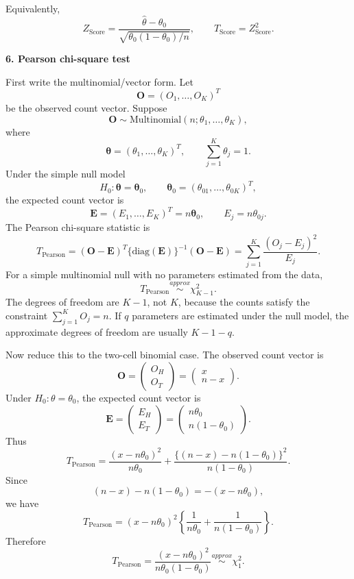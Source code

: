 \documentclass[12pt]{article}
\begin{document}
Equivalently,
\[
Z_{\mathrm{Score}}
=\frac{\hat\theta-\theta_0}{\sqrt{\theta_0(1-\theta_0)/n}},
\qquad
T_{\mathrm{Score}}=Z_{\mathrm{Score}}^2.
\]
\smallskip

{\bf 6. Pearson chi-square test}

First write the multinomial/vector form. Let
\[
\mathbf O=(O_1,\ldots,O_K)^T
\]
be the observed count vector. Suppose
\[
\mathbf O\sim \mathrm{Multinomial}(n;\theta_1,\ldots,\theta_K),
\]
where
\[
\boldsymbol\theta=(\theta_1,\ldots,\theta_K)^T,
\qquad
\sum_{j=1}^K \theta_j=1.
\]
Under the simple null model
\[
H_0: \boldsymbol\theta=\boldsymbol\theta_0,
\qquad
\boldsymbol\theta_0=(\theta_{01},\ldots,\theta_{0K})^T,
\]
the expected count vector is
\[
\mathbf E=(E_1,\ldots,E_K)^T=n\boldsymbol\theta_0,
\qquad
E_j=n\theta_{0j}.
\]
The Pearson chi-square statistic is
\[
T_{\mathrm{Pearson}}
=(\mathbf O-\mathbf E)^T
\{\mathrm{diag}(\mathbf E)\}^{-1}
(\mathbf O-\mathbf E)
=\sum_{j=1}^K \frac{(O_j-E_j)^2}{E_j}.
\]
For a simple multinomial null with no parameters estimated from the data,
\[
T_{\mathrm{Pearson}}\overset{approx}{\sim}\chi^2_{K-1}.
\]
The degrees of freedom are $K-1$, not $K$, because the counts satisfy the constraint $\sum_{j=1}^K O_j=n$.
If $q$ parameters are estimated under the null model, the approximate degrees of freedom are usually $K-1-q$.

Now reduce this to the two-cell binomial case. The observed count vector is
\[
\mathbf O=\begin{pmatrix}O_H\\O_T\end{pmatrix}
=\begin{pmatrix}x\\n-x\end{pmatrix}.
\]
Under $H_0:\theta=\theta_0$, the expected count vector is
\[
\mathbf E=\begin{pmatrix}E_H\\E_T\end{pmatrix}
=\begin{pmatrix}n\theta_0\\n(1-\theta_0)\end{pmatrix}.
\]
Thus
\[
T_{\mathrm{Pearson}}
=\frac{(x-n\theta_0)^2}{n\theta_0}
+\frac{\{(n-x)-n(1-\theta_0)\}^2}{n(1-\theta_0)}.
\]
Since
\[
(n-x)-n(1-\theta_0)=-(x-n\theta_0),
\]
we have
\[
T_{\mathrm{Pearson}}
=(x-n\theta_0)^2
\left\{\frac{1}{n\theta_0}+\frac{1}{n(1-\theta_0)}\right\}.
\]
Therefore
\[
T_{\mathrm{Pearson}}
=\frac{(x-n\theta_0)^2}{n\theta_0(1-\theta_0)}
\overset{approx}{\sim}\chi^2_1.
\]
\end{document}
